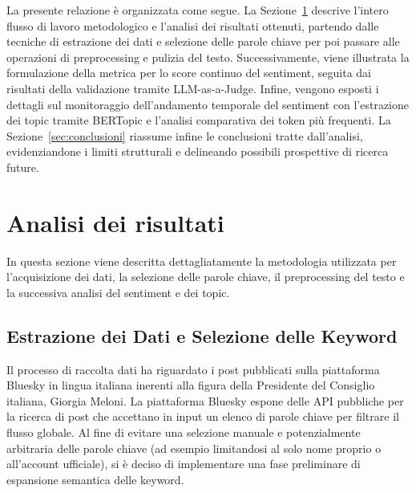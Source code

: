 \documentclass[11pt]{article}
\begin{document}
La presente relazione è organizzata come segue. La Sezione~\ref{sec:analisi} descrive l'intero flusso di lavoro metodologico e l'analisi dei risultati ottenuti, partendo dalle tecniche di estrazione dei dati e selezione delle parole chiave per poi passare alle operazioni di preprocessing e pulizia del testo. Successivamente, viene illustrata la formulazione della metrica per lo score continuo del sentiment, seguita dai risultati della validazione tramite LLM-as-a-Judge. Infine, vengono esposti i dettagli sul monitoraggio dell'andamento temporale del sentiment con l'estrazione dei topic tramite BERTopic e l'analisi comparativa dei token più frequenti. La Sezione~\ref{sec:conclusioni} riassume infine le conclusioni tratte dall'analisi, evidenziandone i limiti strutturali e delineando possibili prospettive di ricerca future.

\newpage
\section{Analisi dei risultati}
\label{sec:analisi}

In questa sezione viene descritta dettagliatamente la metodologia utilizzata per l'acquisizione dei dati, la selezione delle parole chiave, il preprocessing del testo e la successiva analisi del sentiment e dei topic.

\subsection{Estrazione dei Dati e Selezione delle Keyword}
\label{sec:estrazione}
Il processo di raccolta dati ha riguardato i post pubblicati sulla piattaforma Bluesky in lingua italiana inerenti alla figura della Presidente del Consiglio italiana, Giorgia Meloni. La piattaforma Bluesky espone delle API pubbliche per la ricerca di post che accettano in input un elenco di parole chiave per filtrare il flusso globale. Al fine di evitare una selezione manuale e potenzialmente arbitraria delle parole chiave (ad esempio limitandosi al solo nome proprio o all'account ufficiale), si è deciso di implementare una fase preliminare di espansione semantica delle keyword.
\end{document}
